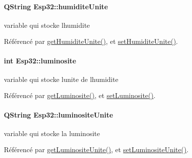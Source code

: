 \paragraph[{\texorpdfstring{humidite\+Unite}{humiditeUnite}}]{\setlength{\rightskip}{0pt plus 5cm}Q\+String Esp32\+::humidite\+Unite\hspace{0.3cm}{\ttfamily [private]}}\hypertarget{class_esp32_a90c1ea9a5598c16a7918205185aa9fd6}{}\label{class_esp32_a90c1ea9a5598c16a7918205185aa9fd6}
variable qui stocke l\textquotesingle{}humidite 

Référencé par \hyperlink{class_esp32_ab2a1fc92c11af031814569f3d2836f33}{get\+Humidite\+Unite()}, et \hyperlink{class_esp32_ae9b2704f36bcd246668354d0ac06ea35}{set\+Humidite\+Unite()}.

\paragraph[{\texorpdfstring{luminosite}{luminosite}}]{\setlength{\rightskip}{0pt plus 5cm}int Esp32\+::luminosite\hspace{0.3cm}{\ttfamily [private]}}\hypertarget{class_esp32_aa6ce86f87c88d7fd29880e9865fefefc}{}\label{class_esp32_aa6ce86f87c88d7fd29880e9865fefefc}
variable qui stocke l\textquotesingle{}unite de l\textquotesingle{}humidite 

Référencé par \hyperlink{class_esp32_aa2cdabace1ce70928c53d25e306a16d1}{get\+Luminosite()}, et \hyperlink{class_esp32_ae60b48e8c808a5108402d5b9f03590ac}{set\+Luminosite()}.

\paragraph[{\texorpdfstring{luminosite\+Unite}{luminositeUnite}}]{\setlength{\rightskip}{0pt plus 5cm}Q\+String Esp32\+::luminosite\+Unite\hspace{0.3cm}{\ttfamily [private]}}\hypertarget{class_esp32_a67087c5b6b76b64f929dbc255a7d5441}{}\label{class_esp32_a67087c5b6b76b64f929dbc255a7d5441}
variable qui stocke la luminosite 

Référencé par \hyperlink{class_esp32_a50f4ef373379d2dbc0fd960438ab6f93}{get\+Luminosite\+Unite()}, et \hyperlink{class_esp32_a36450bcd23e7676d1f0a46e8bec31275}{set\+Luminosite\+Unite()}.

